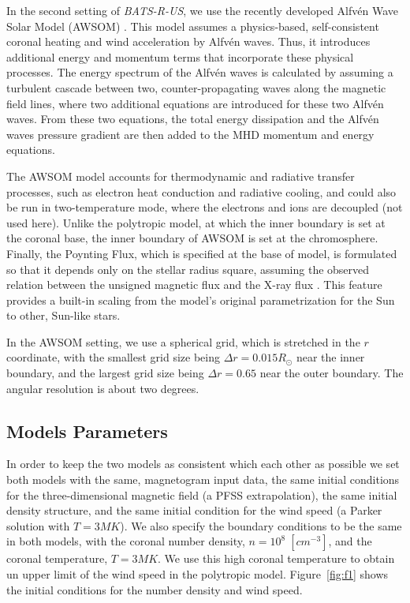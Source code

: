 \documentclass[apj]{emulateapj}
\begin{document}
In the second setting of {\it BATS-R-US}, we use the recently developed Alfv\'en Wave Solar Model (AWSOM) \citep{Sokolov13,Vanderholst14}. This model assumes a physics-based, self-consistent coronal heating and wind acceleration by Alfv\'en waves. Thus, it introduces additional energy and momentum terms that incorporate these physical processes. The energy spectrum of the Alfv\'en waves is calculated by assuming a turbulent cascade between two, counter-propagating waves along the magnetic field lines, where two additional equations are introduced for these two Alfv\'en waves. From these two equations, the total energy dissipation and the Alfv\'en waves pressure gradient are then added to the MHD momentum and energy equations. 

The AWSOM model accounts for thermodynamic and radiative transfer processes, such as electron heat conduction and radiative cooling, and could also be run in two-temperature mode, where the electrons and ions are decoupled (not used here). Unlike the polytropic model, at which the inner boundary is set at the coronal base, the inner boundary of AWSOM is set at the chromosphere. Finally, the Poynting Flux, which is specified at the base of model, is formulated so that it depends only on the stellar radius square, assuming the observed relation between the unsigned magnetic flux and the X-ray flux \citep{Pevtsov03}. This feature provides a built-in scaling from the model's original parametrization for the Sun to other, Sun-like stars. 

In the AWSOM setting, we use a spherical grid, which is stretched in the $r$ coordinate, with the smallest grid size being $\Delta r=0.015R_\odot$ near the inner boundary, and the largest grid size being $\Delta r=0.65$  near the outer boundary. The angular resolution is about two degrees.

\subsection{Models Parameters}
\label{sec:ModelParameters}

In order to keep the two models as consistent which each other as possible we set both models with the same, magnetogram input data, the same initial conditions for the three-dimensional magnetic field (a PFSS extrapolation), the same initial density structure, and the same initial condition for the wind speed (a Parker solution with $T=3MK$). We also specify the boundary conditions to be the same in both models, with the coronal number density, $n=10^8\;[cm^{-3}]$, and the coronal temperature, $T=3MK$. We use this high coronal temperature to obtain un upper limit of the wind speed in the polytropic model. Figure~\ref{fig:f1} shows the initial conditions for the number density and wind speed. 
\end{document}
